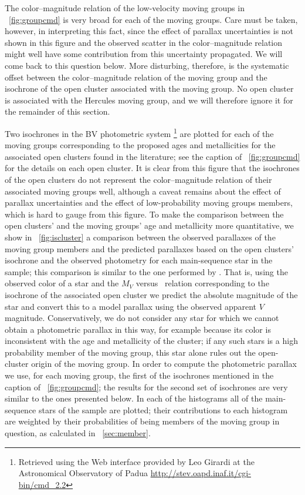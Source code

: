 The color--magnitude relation of the low-velocity moving groups in
\figurename~\ref{fig:groupcmd} is very broad for each of the moving
groups. Care must be taken, however, in interpreting this fact, since
the effect of parallax uncertainties is not shown in this figure and
the observed scatter in the color--magnitude relation might well have
some contribution from this uncertainty propagated. We will come back
to this question below. More disturbing, therefore, is the systematic
offset between the color--magnitude relation of the moving group and
the isochrone of the open cluster associated with the moving group. No
open cluster is associated with the Hercules moving group, and we will
therefore ignore it for the remainder of this section.

Two isochrones in the BV photometric system
\citep{Marigo08a,Bertelli94a,Maiz06a}\footnote{Retrieved using the Web
interface provided by Leo Girardi at the Astronomical Observatory of
Padua \url{http://stev.oapd.inaf.it/cgi-bin/cmd_2.2}} are plotted for
each of the moving groups corresponding to the proposed ages and
metallicities for the associated open clusters found in the
literature; see the caption of \figurename~\ref{fig:groupcmd} for the
details on each open cluster. It is clear from this figure that the
isochrones of the open clusters do not represent the color--magnitude
relation of their associated moving groups well, although a caveat
remains about the effect of parallax uncertainties and the effect of
low-probability moving groups members, which is hard to gauge from
this figure. To make the comparison between the open clusters' and the
moving groups' age and metallicity more quantitative, we show in
\figurename~\ref{fig:iscluster} a comparison between the observed
parallaxes of the moving group members and the predicted parallaxes
based on the open clusters' isochrone and the observed photometry for
each main-sequence star in the sample; this comparison is similar to
the one performed by \citet{Famaey08a}. That is, using the observed
color of a star and the $M_V$ versus \bminusv\ relation corresponding
to the isochrone of the associated open cluster we predict the
absolute magnitude of the star and convert this to a model parallax
using the observed apparent $V$ magnitude. Conservatively, we do not
consider any star for which we cannot obtain a photometric parallax in
this way, for example because its color is inconsistent with the age
and metallicity of the cluster; if any such stars is a high
probability member of the moving group, this star alone rules out the
open-cluster origin of the moving group. In order to compute the
photometric parallax we use, for each moving group, the first of the
isochrones mentioned in the caption of \figurename~\ref{fig:groupcmd};
the results for the second set of isochrones are very similar to the
ones presented below. In each of the histograms all of the
main-sequence stars of the sample are plotted; their contributions to
each histogram are weighted by their probabilities of being members of
the moving group in question, as calculated in
\sectionname~\ref{sec:member}.

